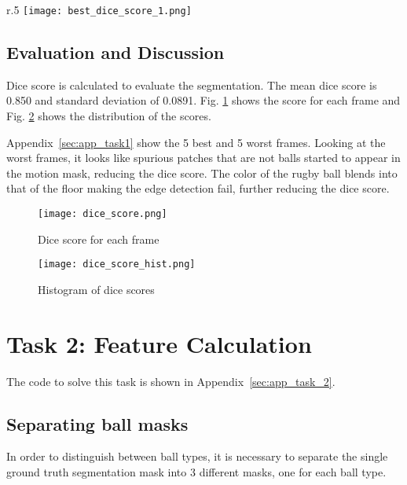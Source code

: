 \documentclass{report}
\begin{document}
\begin{wrapfigure}{r}{.5\textwidth}
    \centering
    \texttt{[image: best\_dice\_score\_1.png]}
    \caption{Best dice score frame. Green circle indicates the ground truth segmentation mask.}
    \label{fig:best_dice_score_1}
\end{wrapfigure}

\section{Evaluation and Discussion}

Dice score is calculated to evaluate the segmentation. The mean dice score is 0.850 and standard deviation of 0.0891. Fig. \ref{fig:dice_score} shows the score for each frame and Fig. \ref{fig:dice_score_hist} shows the distribution of the scores.

Appendix~\ref{sec:app_task1} show the 5 best and 5 worst frames. Looking at the worst frames, it looks like spurious patches that are not balls started to appear in the motion mask, reducing the dice score. The color of the rugby ball blends into that of the floor making the edge detection fail, further reducing the dice score.

\begin{figure}
    \centering
    \texttt{[image: dice\_score.png]}
    \caption{Dice score for each frame}
    \label{fig:dice_score}
\end{figure}

\begin{figure}
    \centering
    \texttt{[image: dice\_score\_hist.png]}
    \caption{Histogram of dice scores}
    \label{fig:dice_score_hist}
\end{figure}

\chapter*{Task 2: Feature Calculation}

The code to solve this task is shown in Appendix~\ref{sec:app_task_2}.

\section{Separating ball masks}

In order to distinguish between ball types, it is necessary to separate the single ground truth segmentation mask into 3 different masks, one for each ball type.
\end{document}
